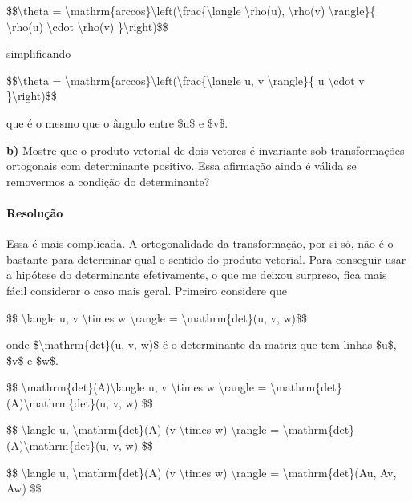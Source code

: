 \$\$\textbackslash{}theta =
\textbackslash{}mathrm\{arccos\}\textbackslash{}left(\textbackslash{}frac\{\textbackslash{}langle
\textbackslash{}rho(u), \textbackslash{}rho(v)
\textbackslash{}rangle\}\{\textbar{} \textbackslash{}rho(u) \textbar{}
\textbackslash{}cdot \textbar{} \textbackslash{}rho(v)
\textbar{}\}\textbackslash{}right)\$\$

simplificando

\$\$\textbackslash{}theta =
\textbackslash{}mathrm\{arccos\}\textbackslash{}left(\textbackslash{}frac\{\textbackslash{}langle
u, v \textbackslash{}rangle\}\{\textbar{} u \textbar{}
\textbackslash{}cdot \textbar{} v \textbar{}\}\textbackslash{}right)\$\$

que é o mesmo que o ângulo entre \$u\$ e \$v\$.

\textbf{b)} Mostre que o produto vetorial de dois vetores é invariante
sob transformações ortogonais com determinante positivo. Essa afirmação
ainda é válida se removermos a condição do determinante?

\hypertarget{resoluuxe7uxe3o-6}{%
\paragraph{Resolução}\label{resoluuxe7uxe3o-6}}

Essa é mais complicada. A ortogonalidade da transformação, por si só,
não é o bastante para determinar qual o sentido do produto vetorial.
Para conseguir usar a hipótese do determinante efetivamente, o que me
deixou surpreso, fica mais fácil considerar o caso mais geral. Primeiro
considere que

\$\$ \textbackslash{}langle u, v \textbackslash{}times w
\textbackslash{}rangle = \textbackslash{}mathrm\{det\}(u, v, w)\$\$

onde \$\textbackslash{}mathrm\{det\}(u, v, w)\$ é o determinante da
matriz que tem linhas \$u\$, \$v\$ e \$w\$.

\$\$ \textbackslash{}mathrm\{det\}(A)\textbackslash{}langle u, v
\textbackslash{}times w \textbackslash{}rangle =
\textbackslash{}mathrm\{det\}(A)\textbackslash{}mathrm\{det\}(u, v, w)
\$\$

\$\$ \textbackslash{}langle u, \textbackslash{}mathrm\{det\}(A) (v
\textbackslash{}times w) \textbackslash{}rangle =
\textbackslash{}mathrm\{det\}(A)\textbackslash{}mathrm\{det\}(u, v, w)
\$\$

\$\$ \textbackslash{}langle u, \textbackslash{}mathrm\{det\}(A) (v
\textbackslash{}times w) \textbackslash{}rangle =
\textbackslash{}mathrm\{det\}(Au, Av, Aw) \$\$

